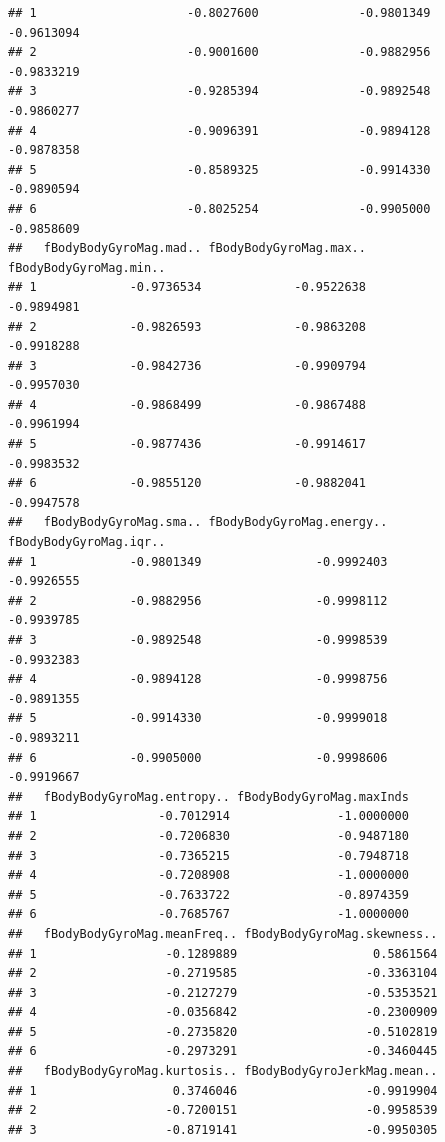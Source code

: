 \documentclass[
]{article}
\begin{document}
\begin{verbatim}
## 1                     -0.8027600              -0.9801349             -0.9613094
## 2                     -0.9001600              -0.9882956             -0.9833219
## 3                     -0.9285394              -0.9892548             -0.9860277
## 4                     -0.9096391              -0.9894128             -0.9878358
## 5                     -0.8589325              -0.9914330             -0.9890594
## 6                     -0.8025254              -0.9905000             -0.9858609
##   fBodyBodyGyroMag.mad.. fBodyBodyGyroMag.max.. fBodyBodyGyroMag.min..
## 1             -0.9736534             -0.9522638             -0.9894981
## 2             -0.9826593             -0.9863208             -0.9918288
## 3             -0.9842736             -0.9909794             -0.9957030
## 4             -0.9868499             -0.9867488             -0.9961994
## 5             -0.9877436             -0.9914617             -0.9983532
## 6             -0.9855120             -0.9882041             -0.9947578
##   fBodyBodyGyroMag.sma.. fBodyBodyGyroMag.energy.. fBodyBodyGyroMag.iqr..
## 1             -0.9801349                -0.9992403             -0.9926555
## 2             -0.9882956                -0.9998112             -0.9939785
## 3             -0.9892548                -0.9998539             -0.9932383
## 4             -0.9894128                -0.9998756             -0.9891355
## 5             -0.9914330                -0.9999018             -0.9893211
## 6             -0.9905000                -0.9998606             -0.9919667
##   fBodyBodyGyroMag.entropy.. fBodyBodyGyroMag.maxInds
## 1                 -0.7012914               -1.0000000
## 2                 -0.7206830               -0.9487180
## 3                 -0.7365215               -0.7948718
## 4                 -0.7208908               -1.0000000
## 5                 -0.7633722               -0.8974359
## 6                 -0.7685767               -1.0000000
##   fBodyBodyGyroMag.meanFreq.. fBodyBodyGyroMag.skewness..
## 1                  -0.1289889                   0.5861564
## 2                  -0.2719585                  -0.3363104
## 3                  -0.2127279                  -0.5353521
## 4                  -0.0356842                  -0.2300909
## 5                  -0.2735820                  -0.5102819
## 6                  -0.2973291                  -0.3460445
##   fBodyBodyGyroMag.kurtosis.. fBodyBodyGyroJerkMag.mean..
## 1                   0.3746046                  -0.9919904
## 2                  -0.7200151                  -0.9958539
## 3                  -0.8719141                  -0.9950305

\end{verbatim}
\end{document}
